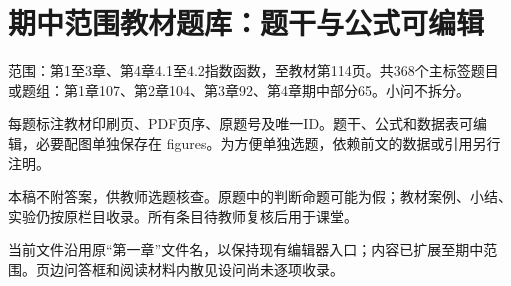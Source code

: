 

\frontmatter\chapter*{期中范围教材题库：题干与公式可编辑}
\noindent 范围：第1至3章、第4章4.1至4.2指数函数，至教材第114页。共368个主标签题目或题组：第1章107、第2章104、第3章92、第4章期中部分65。小问不拆分。
\par 每题标注教材印刷页、PDF页序、原题号及唯一ID。题干、公式和数据表可编辑，必要配图单独保存在 figures。为方便单独选题，依赖前文的数据或引用另行注明。
\par 本稿不附答案，供教师选题核查。原题中的判断命题可能为假；教材案例、小结、实验仍按原栏目收录。所有条目待教师复核后用于课堂。
\par 当前文件沿用原“第一章”文件名，以保持现有编辑器入口；内容已扩展至期中范围。页边问答框和阅读材料内散见设问尚未逐项收录。
\tableofcontents\mainmatter



